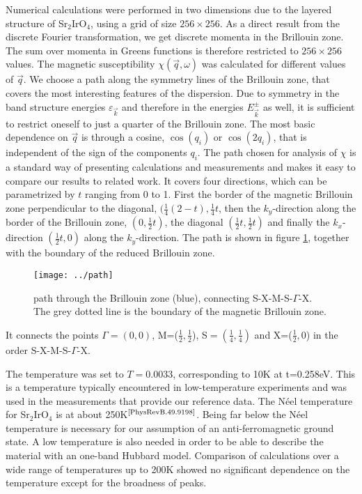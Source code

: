 Numerical calculations were performed in two dimensions due to the layered structure of Sr$_2$IrO$_4$, 
using a grid of size $256\times256$.
As a direct result from the discrete Fourier transformation, we get discrete momenta in the Brillouin zone.
The sum over momenta in Greens functions is therefore restricted to $256\times256$ values.
The magnetic susceptibility $\chi(\vec q,\omega)$ was calculated for different values of $\vec q$.
We choose a path along the symmetry lines of the Brillouin zone, that covers the most interesting features of the dispersion.
Due to symmetry in the band structure energies $\varepsilon_{\vec k}$ and therefore in the energies $E^{\pm}_{\vec k}$ as well,
it is sufficient to restrict oneself to just a quarter of the Brillouin zone.
The most basic dependence on $\vec q$ is through a cosine, $\cos (q_i)$ or $\cos(2q_i)$, that is independent of the sign of the components $q_i$.
%
The path chosen for analysis of $\chi$ is a standard way of presenting calculations and measurements and makes it easy to compare our results to related work.
It covers four directions, which can be parametrized by $t$ ranging from 0 to 1.
First the border of the magnetic Brillouin zone perpendicular to the diagonal, $(\frac14(2-t),\frac14t$, 
then the $k_y$-direction along the border of the Brillouin zone, $(0,\frac12t)$,
the diagonal $(\frac12t,\frac12t)$
and finally 
the $k_x$-direction $(\frac12t,0)$ along the $k_y$-direction.
The path is shown in figure \ref{path}, together with the boundary of the reduced Brillouin zone.
\begin{figure}
 \begin{center}
  \texttt{[image: ../path]}
  \caption{path through the Brillouin zone (blue), connecting S-X-M-S-$\Gamma$-X. The grey dotted line is the boundary of the magnetic Brillouin zone.}
 \label{path}
 \end{center}
\end{figure}
It connects the points $\Gamma=(0,0)$, M=($\frac12,\frac12$), S$=(\frac14,\frac14)$ and X=($\frac12,0$) in the order S-X-M-S-$\Gamma$-X.

The temperature was set to $T=0.0033$, corresponding to 10K at t=0.258eV.
This is a temperature  typically encountered in low-temperature experiments and was used in the measurements that provide our reference data. 
The Néel temperature for Sr$_2$IrO$_4$ is at about 250K$^{\text{\cite{PhysRevB.49.9198}}}$.
Being far below the Néel temperature is necessary for our assumption of an anti-ferromagnetic ground state.
A low temperature is also needed in order to be able to describe the material with an one-band Hubbard model. 
Comparison of calculations over a wide range of temperatures up to 200K showed no significant dependence on the temperature except for the broadness of peaks.


